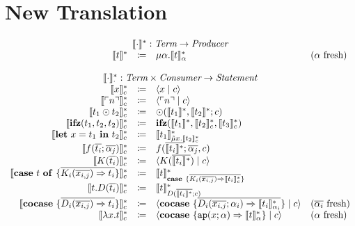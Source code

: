 \documentclass[nonacm]{acmart}
\newcommand{\lit}[1]{\ensuremath{\ulcorner #1 \urcorner}}
\newcommand{\cut}[2]{\ensuremath{\langle #1 \mid #2 \rangle}}
\newcommand{\ifz}[3]{\ensuremath{\mathbf{ifz}(#1, #2, #3)}}
\newcommand{\letin}[3]{\ensuremath{\mathbf{let}\ #1 = #2\ \mathbf{in}\ #3}}
\newcommand{\caseof}[2]{\ensuremath{\mathbf{case}\ #1\ \mathbf{of}\ \{ #2 \}}}
\newcommand{\case}[1]{\ensuremath{\mathbf{case}\ \{ #1 \}}}
\newcommand{\cocase}[1]{\ensuremath{\mathbf{cocase}\ \{ #1 \}}}
\newcommand{\translatestar}[2]{\ensuremath{\llbracket #1 \rrbracket_{#2}^{\ast}}}
\newcommand{\fresh}[1]{\ensuremath{(#1\text{ fresh})}}
\begin{document}
\section{New Translation}
\label{sec:new-translation}

\[
  \begin{array}{rcll}
    \multicolumn{4}{c}{\translatestar{\cdot}{} : \emph{Term} \rightarrow  \emph{Producer}}\\
    \translatestar{t}{} & \coloneqq & \mu\alpha.\translatestar{t}{\alpha} & \fresh{\alpha}\\
    \\
    \multicolumn{4}{c}{\translatestar{\cdot}{\cdot} : \emph{Term} \times \emph{Consumer} \rightarrow \emph{Statement}}\\
    \translatestar{x}{c} & \coloneq & \cut{x}{c} & \\
    \translatestar{\lit{n}}{c} & \coloneq & \cut{\lit{n}}{c} & \\
    \translatestar{t_1 \odot t_2}{c} & \coloneq & \odot(\translatestar{t_1}{},\translatestar{t_2}{};c) & \\
    \translatestar{\ifz{t_1}{t_2}{t_2}}{c} & \coloneq & \ifz{\translatestar{t_1}{}}{\translatestar{t_2}{c}}{\translatestar{t_3}{c}} & \\
    \translatestar{\letin{x}{t_1}{t_2}}{c} & \coloneq & \translatestar{t_1}{\tilde{\mu}x.\translatestar{t_2}{c}} & \\
    \translatestar{f(\overline{t_i}; \overline{\alpha_j})}{c} & \coloneq & f(\overline{\translatestar{t_i}{}}; \overline{\alpha_j}, c) & \\
    \translatestar{K(\overline{t_i})}{c} & \coloneq & \cut{K(\overline{\translatestar{t_i}{}})}{c} & \\
    \translatestar{\caseof{t}{\overline{K_i(\overline{x_{i,j}}) \Rightarrow t_i}}}{c} & \coloneq & \translatestar{t}{\case{\overline{K_i(\overline{x_{i,j}}) \Rightarrow \translatestar{t_i}{c}}}} & \\
    \translatestar{t.D(\overline{t_i})}{c} & \coloneq & \translatestar{t}{D(\overline{\translatestar{t_i}{}}; c)} & \\
    \translatestar{\cocase{\overline{D_i(\overline{x_{i,j}}) \Rightarrow t_i}}}{c} & \coloneq & \cut{\cocase{\overline{D_i(\overline{x_{i,j}}; \alpha_i) \Rightarrow \translatestar{t_i}{\alpha_i}}}}{c} & \fresh{\overline{\alpha_i}} \\
    \translatestar{\lambda x.t}{c} & \coloneq & \cut{\cocase{\mathtt{ap}(x; \alpha) \Rightarrow \translatestar{t}{\alpha}}}{c} & \fresh{\alpha} \\

\end{array}\]
\end{document}
